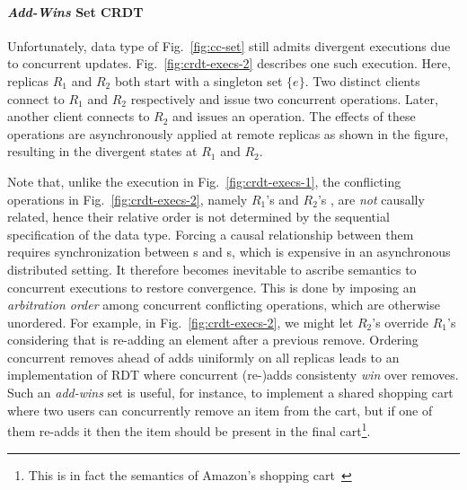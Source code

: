 \noindent\paragraph{\emph{Add-Wins} Set CRDT} Unfortunately, 
data type of Fig.~\ref{fig:cc-set} still admits divergent executions
due to concurrent updates.  Fig.~\ref{fig:crdt-execs-2} describes one
such execution. Here, replicas $R_1$ and $R_2$ both start with a
singleton set $\{e\}$.  Two distinct clients connect to $R_1$ and
$R_2$ respectively and issue two concurrent 
operations. Later, another client connects to $R_2$ and issues an
 operation. The effects of these operations are
asynchronously applied at remote replicas as shown in the figure,
resulting in the divergent states at $R_1$ and $R_2$.

Note that, unlike the execution in Fig.~\ref{fig:crdt-execs-1}, the
conflicting operations in Fig.~\ref{fig:crdt-execs-2}, namely $R_1$'s
 and $R_2$'s , are \emph{not} causally related,
hence their relative order is not determined by the sequential
specification of the data type. Forcing a causal relationship between
them requires synchronization between s and s,
which is expensive in an asynchronous distributed setting. It
therefore becomes inevitable to ascribe semantics to concurrent
executions to restore convergence. This is done by imposing an
\emph{arbitration order} among concurrent conflicting operations,
which are otherwise unordered. For example, in
Fig.~\ref{fig:crdt-execs-2}, we might let $R_2$'s  override
$R_1$'s  considering that  is re-adding an
element after a previous remove. Ordering concurrent removes ahead
of adds uiniformly on all replicas leads to an implementation of
 RDT where concurrent (re-)adds consistenty \emph{win}
over removes. Such an \emph{add-wins} set is useful, for instance, to
implement a shared shopping cart where two users can concurrently
remove an item from the cart, but if one of them re-adds it then the
item should be present in the final cart\footnote{This is in fact the
semantics of Amazon's shopping cart~\cite{dynamo}}.

